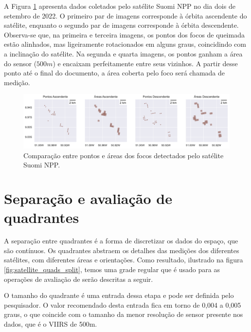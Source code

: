 \documentclass[cic,tc]{iiufrgs}
\begin{document}
A Figura \ref{fig:comparacao_pontos_e_areas} apresenta dados coletados pelo satélite  Suomi NPP no dia dois de setembro de 2022. O primeiro par de imagens corresponde à órbita ascendente do satélite, enquanto o segundo par de imagens corresponde à órbita descendente. Observa-se que, na primeira e terceira imagens, os pontos dos focos de queimada estão alinhados, mas ligeiramente rotacionados em alguns graus, coincidindo com a inclinação do satélite. Na segunda e quarta imagens, os pontos ganham a área do sensor ($500m$) e encaixam perfeitamente entre seus vizinhos. A partir desse ponto até o final do documento, a área coberta pelo foco será chamada de medição. \par

\begin{figure}[H]
    \caption{Comparação entre pontos e áreas dos focos detectados pelo satélite Suomi NPP.}
    \begin{center}
        \includegraphics[width=35em]{comparacao_pontos_e_areas}
    \end{center}
    \label{fig:comparacao_pontos_e_areas}
\end{figure}

\section{Separação e avaliação de quadrantes}

A separação entre quadrantes é a forma de discretizar os dados do espaço, que são contínuos. Os quadrantes abstraem os detalhes das medições dos diferentes satélites, com diferentes áreas e orientações. Como resultado, ilustrado na figura \ref{fig:satellite_quads_split}, temos uma grade regular que é usado para as operações de avaliação de serão descritas a seguir. \par

O tamanho do quadrante é uma entrada dessa etapa e pode ser definida pelo pesquisador. O valor recomendado desta entrada fica em torno de 0,004 a 0,005 graus, o que coincide com o tamanho da menor resolução de sensor presente nos dados, que é o VIIRS de 500m. \par
\end{document}
